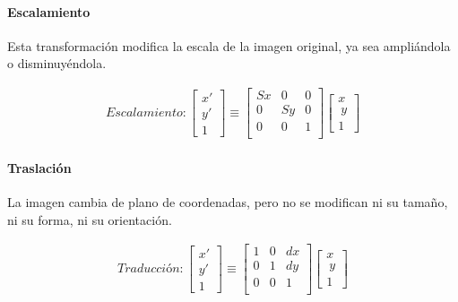 \paragraph{Escalamiento} 

Esta transformación modifica la escala de la imagen original, ya sea ampliándola o disminuyéndola.



\begin{gather}
	Escalamiento:
	\begin{bmatrix} x' \\ y' \\ 1 \end{bmatrix}
	\equiv
	 \begin{bmatrix}
	  Sx & 0 & 0 \\
	  0 & Sy & 0 \\
	  0 & 0 & 1 \\
	  \end{bmatrix}
	  \begin{bmatrix} x \\\ y \\ 1 \end{bmatrix}
\end{gather}

\paragraph{Traslación}

La imagen cambia de plano de coordenadas, pero no se modifican ni su tamaño, ni su forma, ni su orientación.


\begin{gather}
	Traducción:
	\begin{bmatrix} x' \\ y' \\ 1 \end{bmatrix}
	\equiv
	 \begin{bmatrix}
	  1 & 0 & dx \\
	  0 & 1 & dy \\
	  0 & 0 & 1 \\
	  \end{bmatrix}
	  \begin{bmatrix} x \\\ y \\ 1 \end{bmatrix}
\end{gather}

